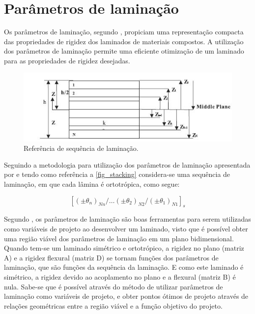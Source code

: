 \section{Parâmetros de laminação}
Os parâmetros de laminação, segundo \cite{tsai1968invariant}, propiciam uma representação compacta das propriedades de rigidez dos laminados de materiais compostos. A utilização dos parâmetros de laminação permite uma eficiente otimização de um laminado para as propriedades de rigidez desejadas.
\begin{figure}[h]
	\caption{\label{fig_stacking}Referência de sequência de laminação.}
  \centering
  \includegraphics[scale=1.0]{figura/Stacking}
\end{figure}

Seguindo a metodologia para utilização dos parâmetros de laminação apresentada por \cite{miki1991optimum} e tendo como referência a \autoref{fig_stacking} considera-se uma sequência de laminação, em que cada lâmina é ortotrópica, como segue:

\begin{equation} \label{stacking}
[(\pm\theta_n)_{Nn}/\dots(\pm\theta_2)_{N2}/(\pm\theta_1)_{N1}]_s
\end{equation}

Segundo \cite{miki1991optimum}, os parâmetros de laminação são boas ferramentas para serem utilizadas como variáveis de projeto ao desenvolver um laminado, visto que é possível obter uma região viável dos parâmetros de laminação em um plano bidimensional. Quando tem-se um laminado simétrico e ortotrópico, a rigidez no plano (matriz A) e a rigidez flexural (matriz D) se tornam funções dos parâmetros de laminação, que são funções da sequência da laminação. E como este laminado é simétrico, a rigidez devido ao acoplamento no plano e a flexural (matriz B) é nula. Sabe-se que é possível através do método de utilizar parâmetros de laminação como variáveis de projeto, e obter pontos ótimos de projeto através de relações geométricas entre a região viável e a função objetivo do projeto.

